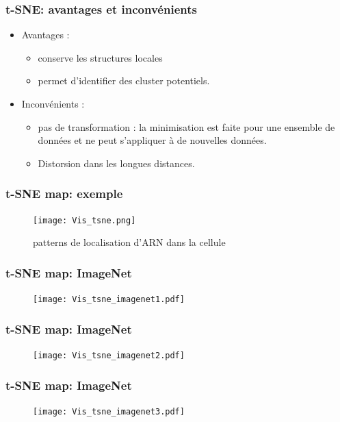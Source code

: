 \begin{frame}
\frametitle{t-SNE: avantages et inconvénients}
  \begin{itemize}
  	\item Avantages : 
  	\begin{itemize}
  		\item conserve les structures locales
  		\item permet d'identifier des cluster potentiels. 
  	\end{itemize}
  	\item Inconvénients : 
  	\begin{itemize}
  		\item pas de transformation : la minimisation est faite pour une ensemble de données et ne peut s'appliquer à de nouvelles données. 
  		\item Distorsion dans les longues distances. 
  	\end{itemize}
  \end{itemize}
\end{frame}

\begin{frame}
\frametitle{t-SNE map: exemple}
\begin{figure}[htb]
  \centering
  \texttt{[image: Vis\_tsne.png]}
  \caption{patterns de localisation d'ARN dans la cellule}
\end{figure}
\end{frame}


\begin{frame}
\frametitle{t-SNE map: ImageNet}
\begin{figure}[htb]
  \centering
  \texttt{[image: Vis\_tsne\_imagenet1.pdf]}
\end{figure}
\end{frame}

\begin{frame}
\frametitle{t-SNE map: ImageNet}
\begin{figure}[htb]
  \centering
  \texttt{[image: Vis\_tsne\_imagenet2.pdf]}
\end{figure}
\end{frame}

\begin{frame}
\frametitle{t-SNE map: ImageNet}
\begin{figure}[htb]
  \centering
  \texttt{[image: Vis\_tsne\_imagenet3.pdf]}
\end{figure}
\end{frame}

